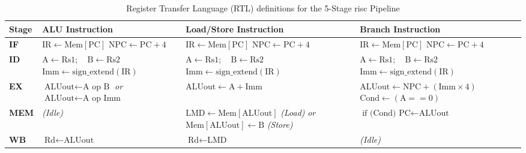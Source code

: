 \begin{table}[!htbp]
    \centering
    \renewcommand{\arraystretch}{1.5} %
    \begin{tabular}{| >{\raggedright\arraybackslash}p{} | >{\raggedright\arraybackslash}p{} | >{\raggedright\arraybackslash}p{} | >{\raggedright\arraybackslash}p{} |}
         \hline
         \textbf{Stage} & \textbf{ALU Instruction} & \textbf{Load/Store Instruction} & \textbf{Branch Instruction} \\
         \hline\hline
         
         \textbf{IF} & 
         \(\text{IR} \leftarrow \text{Mem}[\text{PC}]\) \newline \(\text{NPC} \leftarrow \text{PC} + 4\) & 
         \(\text{IR} \leftarrow \text{Mem}[\text{PC}]\) \newline \(\text{NPC} \leftarrow \text{PC} + 4\) & 
         \(\text{IR} \leftarrow \text{Mem}[\text{PC}]\) \newline \(\text{NPC} \leftarrow \text{PC} + 4\) \\
         \hline
         
         \textbf{ID} & 
         \(\text{A} \leftarrow \text{Rs1}; \quad \text{B} \leftarrow \text{Rs2}\) \newline \(\text{Imm} \leftarrow \text{sign\_extend}(\text{IR})\) & 
         \(\text{A} \leftarrow \text{Rs1}; \quad \text{B} \leftarrow \text{Rs2}\) \newline \(\text{Imm} \leftarrow \text{sign\_extend}(\text{IR})\) & 
         \(\text{A} \leftarrow \text{Rs1}; \quad \text{B} \leftarrow \text{Rs2}\) \newline \(\text{Imm} \leftarrow \text{sign\_extend}(\text{IR})\) \\
         \hline
         
         \textbf{EX} & 
         \(\text{ALUout} \leftarrow \text{A op B}\) \newline \textit{or} \(\text{ALUout} \leftarrow \text{A op Imm}\) & 
         \(\text{ALUout} \leftarrow \text{A} + \text{Imm}\) & 
         \(\text{ALUout} \leftarrow \text{NPC} + (\text{Imm} \times 4)\) \newline \(\text{Cond} \leftarrow (\text{A} == 0)\) \\
         \hline
         
         \textbf{MEM} & 
         \textit{(Idle)} & 
         \(\text{LMD} \leftarrow \text{Mem}[\text{ALUout}]\) \textit{(Load)} \newline \textit{or} \(\text{Mem}[\text{ALUout}] \leftarrow \text{B}\) \textit{(Store)} & 
         \(\text{if (Cond) PC} \leftarrow \text{ALUout}\) \\
         \hline
         
         \textbf{WB} & 
         \(\text{Rd} \leftarrow \text{ALUout}\) & 
         \(\text{Rd} \leftarrow \text{LMD}\) & 
         \textit{(Idle)} \\
         \hline
    \end{tabular}
    \caption{Register Transfer Language (RTL) definitions for the 5-Stage \gls{risc} Pipeline}
    \label{tab:pipeline-rtl}
\end{table}

